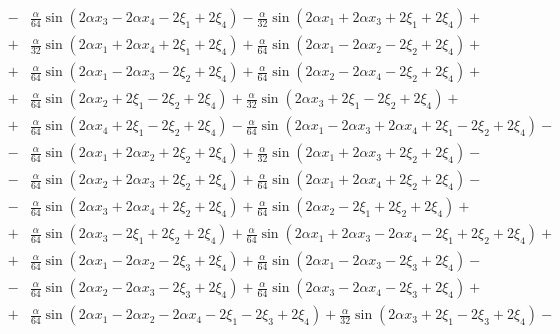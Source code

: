 \documentclass[11pt]{jfm}
\numberwithin{equation}{section}
\begin{document}
\begin{eqnarray}
&\!-\!& \frac{\alpha}{64} \sin(2\alpha x_3 \!-\! 2\alpha x_4 \!-\! 2\xi_1 \!+\! 2\xi_4)\!-\! \frac{\alpha}{32} \sin(2\alpha x_1 \!+\! 2\alpha x_3 \!+\! 2\xi_1 \!+\! 2\xi_4)\!+\!\nonumber\\
&\!+\!& \frac{\alpha}{32} \sin(2\alpha x_1 \!+\! 2\alpha x_4 \!+\! 2\xi_1 \!+\! 2\xi_4)\!+\! \frac{\alpha}{64} \sin(2\alpha x_1 \!-\! 2\alpha x_2 \!-\! 2\xi_2 \!+\! 2\xi_4)\!+\!\nonumber\\
&\!+\! &\frac{\alpha}{64} \sin(2\alpha x_1 \!-\! 2\alpha x_3 \!-\! 2\xi_2 \!+\! 2\xi_4) \!+\! \frac{\alpha}{64} \sin(2\alpha x_2 \!-\! 2\alpha x_4 \!-\! 2\xi_2 \!+\! 2\xi_4)\!+\!\nonumber\\
&\!+\!& \frac{\alpha}{64} \sin(2\alpha x_2 \!+\! 2\xi_1 \!-\! 2\xi_2 \!+\! 2\xi_4)\!+\! \frac{\alpha}{32} \sin(2\alpha x_3 \!+\! 2\xi_1 \!-\! 2\xi_2 \!+\! 2\xi_4)\!+\!\nonumber\\
&\!+\!& \frac{\alpha}{64} \sin(2\alpha x_4 \!+\! 2\xi_1 \!-\! 2\xi_2 \!+\! 2\xi_4)\!-\! \frac{\alpha}{64} \sin(2\alpha x_1 \!-\! 2\alpha x_3 \!+\! 2\alpha x_4 \!+\! 2\xi_1 \!-\! 2\xi_2 \!+\! 2\xi_4)\!-\!\nonumber\\
&\!-\! &\frac{\alpha}{64} \sin(2\alpha x_1 \!+\! 2\alpha x_2 \!+\! 2\xi_2 \!+\! 2\xi_4)\!+\! \frac{\alpha}{32} \sin(2\alpha x_1 \!+\! 2\alpha x_3 \!+\! 2\xi_2 \!+\! 2\xi_4)\!-\!\nonumber\\
&\!-\! &\frac{\alpha}{64} \sin(2\alpha x_2 \!+\! 2\alpha x_3 \!+\! 2\xi_2 \!+\! 2\xi_4)\!+\! \frac{\alpha}{64} \sin(2\alpha x_1 \!+\! 2\alpha x_4 \!+\! 2\xi_2 \!+\! 2\xi_4)\!-\!\nonumber\\
&\!-\!& \frac{\alpha}{64} \sin(2\alpha x_3 \!+\! 2\alpha x_4 \!+\! 2\xi_2 \!+\! 2\xi_4)\!+\! \frac{\alpha}{64} \sin(2\alpha x_2 \!-\! 2\xi_1 \!+\! 2\xi_2 \!+\! 2\xi_4)\!+\!\nonumber\\
&\!+\!& \frac{\alpha}{64} \sin(2\alpha x_3 \!-\! 2\xi_1 \!+\! 2\xi_2 \!+\! 2\xi_4)\!+\! \frac{\alpha}{64} \sin(2\alpha x_1 \!+\! 2\alpha x_3 \!-\! 2\alpha x_4 \!-\! 2\xi_1 \!+\! 2\xi_2 \!+\! 2\xi_4)\!+\!\nonumber\\
&\!+\!& \frac{\alpha}{64} \sin(2\alpha x_1 \!-\! 2\alpha x_2 \!-\! 2\xi_3 \!+\! 2\xi_4)\!+\! \frac{\alpha}{64} \sin(2\alpha x_1 \!-\! 2\alpha x_3 \!-\! 2\xi_3 \!+\! 2\xi_4)\!-\!\nonumber\\
&\!-\!& \frac{\alpha}{64} \sin(2\alpha x_2 \!-\! 2\alpha x_3 \!-\! 2\xi_3 \!+\! 2\xi_4)\!+\! \frac{\alpha}{64} \sin(2\alpha x_3 \!-\! 2\alpha x_4 \!-\! 2\xi_3 \!+\! 2\xi_4)\!+\! \nonumber\\
&\!+\!& \frac{\alpha}{64} \sin(2\alpha x_1 \!-\! 2\alpha x_2 \!-\! 2\alpha x_4 \!-\! 2\xi_1 \!-\! 2\xi_3 \!+\! 2\xi_4) \!+\! \frac{\alpha}{32} \sin(2\alpha x_3 \!+\! 2\xi_1 \!-\! 2\xi_3 \!+\! 2\xi_4)\!-\! \nonumber\\

\end{eqnarray}
\end{document}
